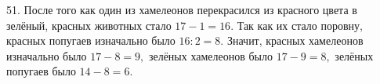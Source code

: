 51. После того как один из хамелеонов перекрасился из красного цвета в зелёный, красных животных стало $17-1=16.$ Так как их стало поровну, красных попугаев изначально было $16:2=8.$ Значит, красных хамелеонов изначально было $17-8=9,$ зелёных хамелеонов было $17-9=8,$ зелёных попугаев было $14-8=6.$\\

